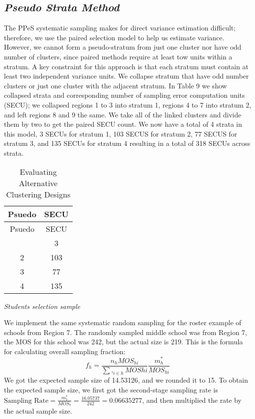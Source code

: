 \documentclass[
  12pt]{article}
\begin{document}
\hfill\break

\subsection{\texorpdfstring{\emph{Pseudo Strata
Method}}{Pseudo Strata Method}}\label{pseudo-strata-method}

The PPeS systematic sampling makes for direct variance estimation
difficult; therefore, we use the paired selection model to help us
estimate variance. However, we cannot form a pseudo-stratum from just
one cluster nor have odd number of clusters, since paired methods
require at least tow units within a stratum. A key constraint for this
approach is that each stratum must contain at least two independent
variance units. We collapse stratum that have odd number clusters or
just one cluster with the adjacent stratum. In Table 9 we show collapsed
strata and corresponding number of sampling error computation units
(SECU); we collapsed regions 1 to 3 into stratum 1, regions 4 to 7 into
stratum 2, and left regions 8 and 9 the same. We take all of the linked
clusters and divide them by two to get the paired SECU count. We now
have a total of 4 strata in this model, 3 SECUs for stratum 1, 103 SECUS
for stratum 2, 77 SECUS for stratum 3, and 135 SECUs for stratum 4
resulting in a total of 318 SECUs across strata.

\begin{longtable}[]{@{}cc@{}}
\caption{Evaluating Alternative Clustering Designs}\tabularnewline
\toprule\noalign{}
Psuedo & SECU \\
\midrule\noalign{}
\endfirsthead
\toprule\noalign{}
Psuedo & SECU \\
\midrule\noalign{}
\endhead
\bottomrule\noalign{}
\endlastfoot
1 & 3 \\
2 & 103 \\
3 & 77 \\
4 & 135 \\
\end{longtable}

\emph{Students selection sample}

We implement the same systematic random sampling for the roster example
of schools from Region 7. The randomly sampled middle school was from
Region 7, the MOS for this school was 242, but the actual size is 219.
This is the formula for calculating overall sampling fraction: \[
f_h = \frac{n_h MOS_{hi} }{\sum,_{i \in h} MOS{hi} } \frac{m^*_h}{MOS_{hi}}
\] We got the expected sample size of 14.53126, and we rounded it to 15.
To obtain the expected sample size, we first got the second-stage
sampling rate is
\(\text{Sampling Rate} = \frac{m^*_{7}}{MOS_7} = \frac{16.05737}{242} = 0.06635277\),
and then multiplied the rate by the actual sample size.
\end{document}
